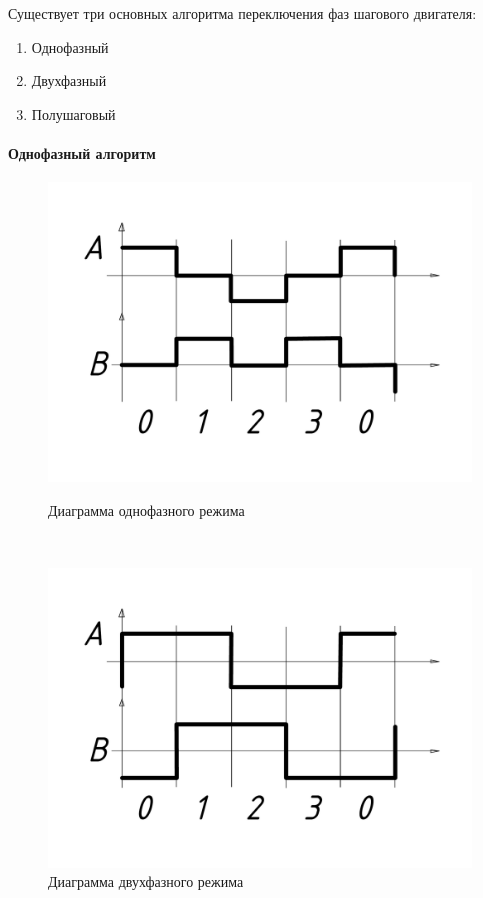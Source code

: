 Существует три основных алгоритма переключения фаз шагового двигателя:

\begin{enumerate}
    \item Однофазный
    \item Двухфазный
    \item Полушаговый
\end{enumerate}

\paragraph{Однофазный алгоритм}

\begin{figure}
    \centering
    \begin{minipage}{0.45\textwidth}
        \centering
        \includegraphics[width=\linewidth, keepaspectratio]
                        {./src/pictures/control_algo/one_phase_algo_vector.pdf}
        \caption{Диаграмма однофазного режима}
        \label{pic_one_phase_algo}
    \end{minipage}~
    \begin{minipage}{0.45\textwidth}
        \centering
        \includegraphics[width=\linewidth, keepaspectratio]
                        {./src/pictures/control_algo/two_phase_algo_vector.pdf}
        \caption{Диаграмма двухфазного режима}
        \label{pic_two_phase_algo}
    \end{minipage}
\end{figure}

